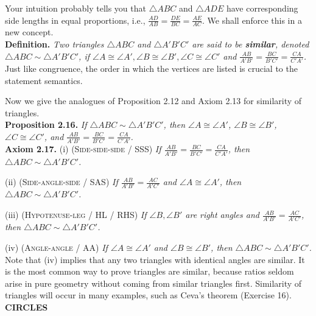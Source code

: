 \documentclass[leqno]{book}
\begin{document}
Your intuition probably tells you that $\triangle ABC$ and $\triangle ADE$ have corresponding side lengths in equal proportions, i.e., $\frac{AD}{AB}=\frac{DE}{BC}=\frac{AE}{AC}$.  We shall enforce this in a new concept.\\

\noindent\textbf{Definition.} \emph{Two triangles $\triangle ABC$ and $\triangle A'B'C'$ are said to be \textbf{similar}, denoted $\triangle ABC\sim\triangle A'B'C'$, if $\angle A\cong\angle A',\angle B\cong\angle B',\angle C\cong\angle C'$ and $\frac{AB}{A'B'}=\frac{BC}{B'C'}=\frac{CA}{C'A'}$.}\\

\noindent Just like congruence, the order in which the vertices are listed is crucial to the statement semantics.

Now we give the analogues of Proposition 2.12 and Axiom 2.13 for similarity of triangles.\\

\noindent\textbf{Proposition 2.16.} \emph{If $\triangle ABC\sim\triangle A'B'C'$, then $\angle A\cong\angle A'$, $\angle B\cong\angle B'$, $\angle C\cong\angle C'$, and $\frac{AB}{A'B'}=\frac{BC}{B'C'}=\frac{CA}{C'A'}$.}\\

\noindent\textbf{Axiom 2.17.} (i) \textsc{(Side-side-side / SSS)} \emph{If $\frac{AB}{A'B'}=\frac{BC}{B'C'}=\frac{CA}{C'A'}$, then $\triangle ABC\sim\triangle A'B'C'$.}

(ii) \textsc{(Side-angle-side / SAS)} \emph{If $\frac{AB}{A'B'}=\frac{AC}{A'C'}$ and $\angle A\cong\angle A'$, then $\triangle ABC\sim\triangle A'B'C'$.}

(iii) \textsc{(Hypotenuse-leg / HL / RHS)} \emph{If $\angle B,\angle B'$ are right angles and $\frac{AB}{A'B'}=\frac{AC}{A'C'}$, then $\triangle ABC\sim\triangle A'B'C'$.}

(iv) \textsc{(Angle-angle / AA)} \emph{If $\angle A\cong\angle A'$ and $\angle B\cong\angle B'$, then $\triangle ABC\sim\triangle A'B'C'$.}\\

\noindent Note that (iv) implies that any two triangles with identical angles are similar.  It is the most common way to prove triangles are similar, because ratios seldom arise in pure geometry without coming from similar triangles first.  Similarity of triangles will occur in many examples, such as Ceva's theorem (Exercise 16).\\

\noindent\textbf{CIRCLES}\\
\end{document}
